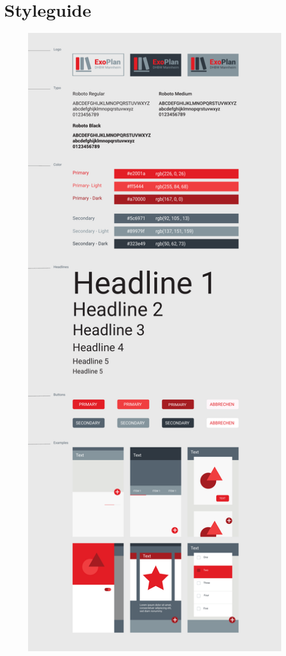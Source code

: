 \chapter{Styleguide}\label{an:Styleguide}
\begin{figure}[H]
	\centering 
	\includegraphics[page=1, width=12.5cm ]{docs/StyleguideEx.pdf}
\end{figure}

